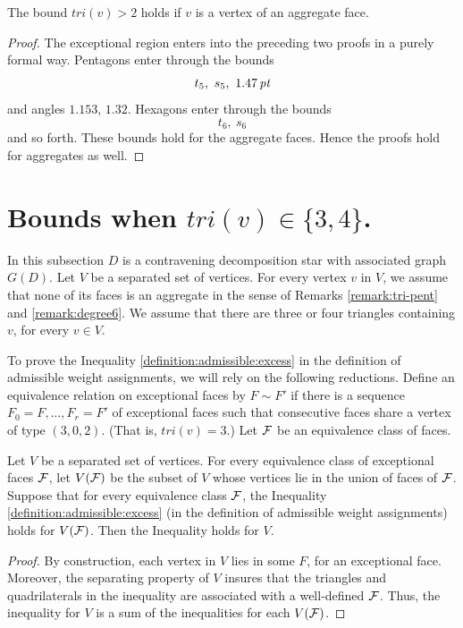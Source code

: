 \begin{lemma} The bound $tri(v)>2$ holds if $v$ is a vertex
of an aggregate face.
\end{lemma}

\begin{proof}
The exceptional region enters into the preceding two proofs in a
purely formal way.  Pentagons enter through the bounds
    $$t_5,\ s_5,\ 1.47\,\hbox{\it pt}$$
and angles $1.153$, $1.32$.  Hexagons enter through the bounds
    $$t_6,\ s_6$$
and so forth.  These bounds hold for the aggregate faces.  Hence
the proofs hold for aggregates as well.
\end{proof}

\section{Bounds when $tri(v)\in\{3,4\}$.  } %
\label{sec:2.7} \label{sec:tri34}

In this subsection $D$ is a contravening decomposition star with
associated graph $G(D)$.  Let $V$ be a separated set of vertices.
For every vertex  $v$ in $V$, we assume that none of its faces is
an aggregate in the sense of Remarks \ref{remark:tri-pent} and
\ref{remark:degree6}.  We assume that there are three or four
triangles containing $v$, for every $v\in V$.

To prove the Inequality \ref{definition:admissible:excess} in the
definition of admissible weight assignments, we will rely on the
following reductions. Define an equivalence relation on
exceptional faces by $F\sim F'$ if there is a sequence
$F_0=F,\ldots, F_r=F'$ of exceptional faces such that consecutive
faces share a vertex of type $(3,0,2)$. (That is, $tri(v)=3$.)
Let ${\cal F}$ be an equivalence class of faces.

\begin{lemma} Let $V$ be a separated set of vertices.  For every
equivalence class of exceptional faces $\cal F$, let $V({\cal F})$
be the subset of $V$ whose vertices lie in the union of faces of
${\cal F}$. Suppose that for every equivalence class $\cal F$, the
Inequality \ref{definition:admissible:excess} (in the definition
of admissible weight assignments) holds for $V({\cal F})$. Then
the Inequality holds for $V$.
\end{lemma}

\begin{proof}
By construction, each vertex in $V$ lies in some $F$, for an
exceptional face.  Moreover, the separating property of $V$
insures that the triangles and quadrilaterals in the inequality
are associated with a well-defined  ${\cal F}$. Thus, the
inequality for $V$ is a sum of the inequalities for each $V({\cal
F})$.
\end{proof}


